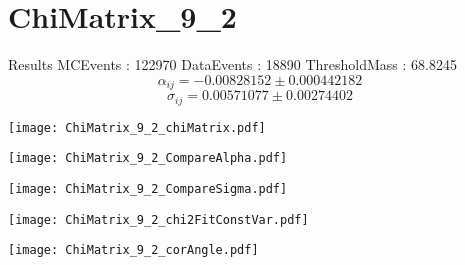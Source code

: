 \documentclass[a4paper,12pt]{article}
\begin{document}
\section{ChiMatrix\_9\_2}
\begin{minipage}{0.49\linewidth} Results \newline
MCEvents : 122970\newline
DataEvents : 18890 \newline
ThresholdMass : 68.8245\\
$$\alpha_{ij} = -0.00828152\pm 0.000442182$$
$$\sigma_{ij} = 0.00571077\pm 0.00274402$$
\end{minipage}\hfill
\begin{minipage}{0.49\linewidth} 
\texttt{[image: ChiMatrix\_9\_2\_chiMatrix.pdf]}\\
\end{minipage}
\hfill
\begin{minipage}{0.49\linewidth} 
\texttt{[image: ChiMatrix\_9\_2\_CompareAlpha.pdf]}\\
\end{minipage}
\hfill
\begin{minipage}{0.49\linewidth} 
\texttt{[image: ChiMatrix\_9\_2\_CompareSigma.pdf]}\\
\end{minipage}
\begin{minipage}{0.49\linewidth} 
\texttt{[image: ChiMatrix\_9\_2\_chi2FitConstVar.pdf]}\\
\end{minipage}
\hfill
\begin{minipage}{0.49\linewidth} 
\texttt{[image: ChiMatrix\_9\_2\_corAngle.pdf]}\\
\end{minipage}
\end{document}
